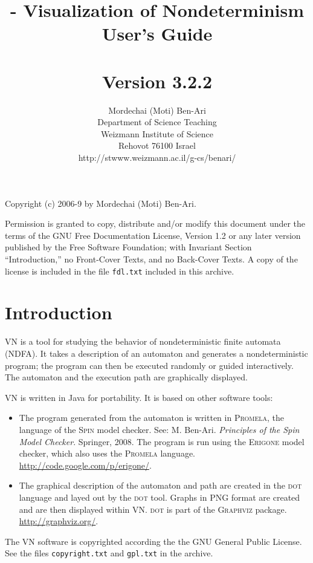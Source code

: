 \documentclass[11pt]{article}
\title{\vn{} - Visualization of Nondeterminism\\
User's Guide\\\mbox{}\\\large{Version 3.2.2}}
\author{Mordechai (Moti) Ben-Ari\\
Department of Science Teaching\\
Weizmann Institute of Science\\
Rehovot 76100 Israel\\
\textsf{http://stwww.weizmann.ac.il/g-cs/benari/}}
\newcommand{\vn}{\textsc{VN}}
\newcommand{\dt}{\textsc{dot}}
\newcommand{\spn}{\textsc{Spin}}
\newcommand{\prm}{\textsc{Promela}}
\newcommand{\erg}{\textsc{Erigone}}
\newcommand{\p}[1]{\texttt{#1}}
\begin{document}
\maketitle
\thispagestyle{empty}

\vfil

\begin{center}
Copyright (c) 2006-9 by Mordechai (Moti) Ben-Ari.
\end{center}

Permission is granted to copy, distribute and/or modify this document
under the terms of the GNU Free Documentation License, Version 1.2 or
any later version published by the Free Software Foundation; with
Invariant Section ``Introduction,'' no Front-Cover Texts, and no
Back-Cover Texts. A copy of the license is included in the file
\p{fdl.txt} included in this archive.

\newpage

\section{Introduction}

\vn{} is a tool for studying the behavior of nondeterministic finite
automata (NDFA). It takes a description of an automaton and generates a
nondeterministic program; the program can then be executed randomly or
guided interactively. The automaton and the execution path are
graphically displayed.

\vn{} is written in Java for portability. It is based on other software
tools:

\begin{itemize}
\item The program generated from the automaton is written in \prm{}, the
language of the \spn{} model checker. See: M. Ben-Ari.
\textit{Principles of the Spin Model Checker}. Springer, 2008. The
program is run using the \erg{} model checker, which also uses the
\prm{} language. \url{http://code.google.com/p/erigone/}.

\item The graphical description of the automaton and path are created in
the \dt{} language and layed out by the \dt{} tool. Graphs in PNG format
are created and are then displayed within \vn{}. \dt{} is part of the
\textsc{Graphviz} package. \url{http://graphviz.org/}.
\end{itemize}

The \vn{} software is copyrighted according the the GNU General Public
License. See the files \p{copyright.txt} and \p{gpl.txt} in the archive.
\end{document}

